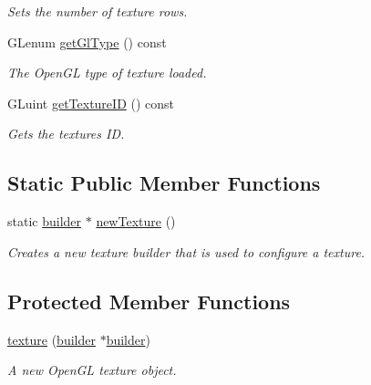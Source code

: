 \begin{DoxyCompactItemize}
\begin{DoxyCompactList}\small\item\em Sets the number of texture rows. \end{DoxyCompactList}\item 
G\+Lenum \hyperlink{classflounder_1_1texture_a4b4839206c63ab911e4a52d055daeb24}{get\+Gl\+Type} () const
\begin{DoxyCompactList}\small\item\em The Open\+GL type of texture loaded. \end{DoxyCompactList}\item 
G\+Luint \hyperlink{classflounder_1_1texture_a2f9a420fd96169046fb3494d4b7dcd90}{get\+Texture\+ID} () const
\begin{DoxyCompactList}\small\item\em Gets the textures ID. \end{DoxyCompactList}\end{DoxyCompactItemize}
\subsection*{Static Public Member Functions}
\begin{DoxyCompactItemize}
\item 
static \hyperlink{classflounder_1_1texture_1_1builder}{builder} $\ast$ \hyperlink{classflounder_1_1texture_af6311afbba328755cd0ff6a7839e9172}{new\+Texture} ()
\begin{DoxyCompactList}\small\item\em Creates a new texture builder that is used to configure a texture. \end{DoxyCompactList}\end{DoxyCompactItemize}
\subsection*{Protected Member Functions}
\begin{DoxyCompactItemize}
\item 
\hyperlink{classflounder_1_1texture_a82dd2e895abe671411ab0fcaaf49b5d1}{texture} (\hyperlink{classflounder_1_1texture_1_1builder}{builder} $\ast$\hyperlink{classflounder_1_1texture_1_1builder}{builder})
\begin{DoxyCompactList}\small\item\em A new Open\+GL texture object. \end{DoxyCompactList}\end{DoxyCompactItemize}
